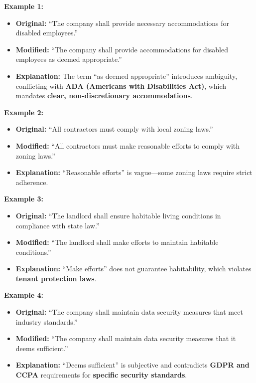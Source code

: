 \documentclass[11pt]{article}
\begin{document}
\begin{tcolorbox}[breakable,colback=lightestgray,colframe=black,title=\textbf{Ambiguity Legal Data Generation Prompt}]
\textbf{Example 1:}
\begin{itemize}
    \item \textbf{Original:} ``The company shall provide necessary accommodations for disabled employees.''
    \item \textbf{Modified:} ``The company shall provide accommodations for disabled employees as deemed appropriate.''
    \item \textbf{Explanation:} The term ``as deemed appropriate'' introduces ambiguity, conflicting with \textbf{ADA (Americans with Disabilities Act)}, which mandates \textbf{clear, non-discretionary accommodations}.
\end{itemize}

\textbf{Example 2:}
\begin{itemize}
    \item \textbf{Original:} ``All contractors must comply with local zoning laws.''
    \item \textbf{Modified:} ``All contractors must make reasonable efforts to comply with zoning laws.''
    \item \textbf{Explanation:} ``Reasonable efforts'' is vague—some zoning laws require strict adherence.
\end{itemize}

\textbf{Example 3:}
\begin{itemize}
    \item \textbf{Original:} ``The landlord shall ensure habitable living conditions in compliance with state law.''
    \item \textbf{Modified:} ``The landlord shall make efforts to maintain habitable conditions.''
    \item \textbf{Explanation:} ``Make efforts'' does not guarantee habitability, which violates \textbf{tenant protection laws}.
\end{itemize}

\textbf{Example 4:}
\begin{itemize}
    \item \textbf{Original:} ``The company shall maintain data security measures that meet industry standards.''
    \item \textbf{Modified:} ``The company shall maintain data security measures that it deems sufficient.''
    \item \textbf{Explanation:} ``Deems sufficient'' is subjective and contradicts \textbf{GDPR and CCPA} requirements for \textbf{specific security standards}.
\end{itemize}


\end{tcolorbox}
\end{document}
